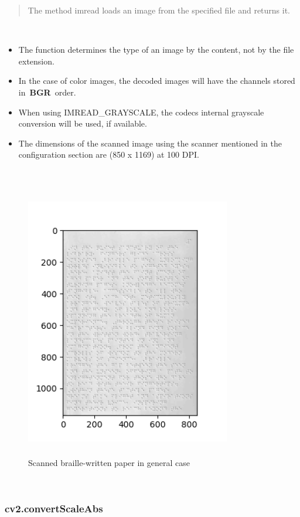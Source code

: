 \begin{quote}
The method imread loads an image from the specified file and returns it.
\end{quote}\\

\begin{itemize}
\item
  The function determines the type of an image by the content, not by
  the file extension.
\item
  In the case of color images, the decoded images will have the channels
  stored in~\textbf{BGR}~order.
\item
  When using IMREAD\_GRAYSCALE, the codec\textquotesingle s internal
  grayscale conversion will be used, if available.
\item
  The dimensions of the scanned image using the scanner mentioned in the
  configuration section are (850 x 1169) at 100 DPI.
\end{itemize}\\


\begin{figure}[h!]
     \centering
        \includegraphics[width=0.8\textwidth,height=12cm]{image9.png}
        \caption{Scanned braille-written paper in general case}
        \label{fig:Scanned braille-written paper in general case}
\end{figure}\\


\hypertarget{cv2.convertscaleabs}{%
\subsubsection{cv2.convertScaleAbs}\label{cv2.convertscaleabs}}

